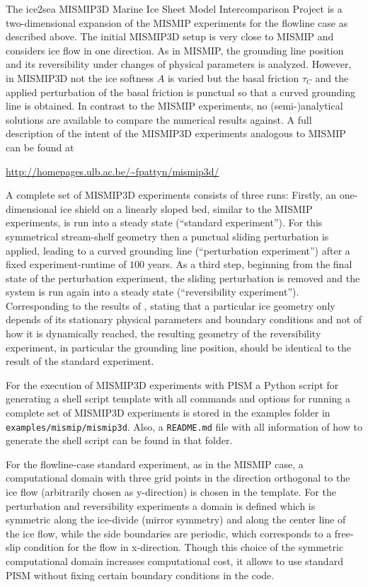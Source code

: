  The ice2sea MISMIP3D Marine Ice Sheet Model Intercomparison Project is a two-dimensional expansion of the MISMIP experiments for the flowline case as described above. The initial MISMIP3D setup is very close to MISMIP and considers ice flow in one direction. As in MISMIP, the grounding line position and its reversibility under changes of physical parameters is analyzed. However, in MISMIP3D not the ice softness $A$ is varied but the basal friction $\tau_C$ and the applied perturbation of the basal friction is punctual so that a curved grounding line is obtained. In contrast to the MISMIP experiments, no (semi-)analytical solutions are available to compare the numerical results against. A full description of the intent of the MISMIP3D experiments analogous to MISMIP can be found at

\centerline{\url{http://homepages.ulb.ac.be/~fpattyn/mismip3d/}}

 A complete set of MISMIP3D experiments consists of three runs: Firstly, an one-dimensional ice shield on a linearly sloped bed, similar to the MISMIP experiments, is run into a steady state (``standard experiment''). For this symmetrical stream-shelf geometry then a punctual sliding perturbation is applied, leading to a curved grounding line (``perturbation experiment'') after a fixed experiment-runtime of $100$ years. As a third step, beginning from the final state of the perturbation experiment, the sliding perturbation is removed and the system is run again into a steady state (``reversibility experiment''). Corresponding to the results of \cite{SchoofMarine1}, stating that a particular ice geometry only depends of its stationary physical parameters and boundary conditions and not of how it is dynamically reached, the resulting geometry of the reversibility experiment, in particular the grounding line position, should be identical to the result of the standard experiment.

For the execution of MISMIP3D experiments with PISM a Python script for generating a shell script template with all commands and options for running a complete set of MISMIP3D experiments is stored in the examples folder in \texttt{examples/mismip/mismip3d}. Also, a \texttt{README.md} file with all information of how to generate the shell script can be found in that folder.

For the flowline-case standard experiment, as in the MISMIP case, a computational domain with three grid points in the direction orthogonal to the ice flow (arbitrarily chosen as y-direction) is chosen in the template. For the perturbation and reversibility experiments a domain is defined which is symmetric along the ice-divide (mirror symmetry) and along the center line of the ice flow, while the side boundaries are periodic, which corresponds to a free-slip condition for the flow in x-direction. Though this choice of the symmetric computational domain increases computational cost, it allows to use standard PISM without fixing certain boundary conditions in the code.

